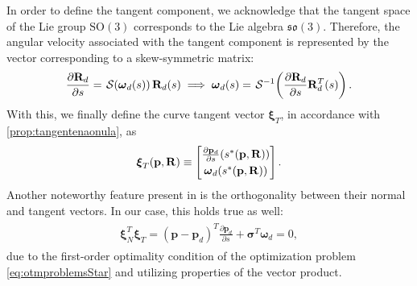 In order to define the tangent component, we acknowledge that the tangent space of the Lie group $\text{SO}(3)$ corresponds to the Lie algebra $\mathfrak{so}(3)$. Therefore, the angular velocity associated with the tangent component is represented by the vector corresponding to a skew-symmetric matrix:
\begin{align}
        \frac{\partial \mathbf{R}_d}{\partial s} = \SL[\boldsymbol{\omega}_d(s)]\mathbf{R}_d(s)
        \implies \boldsymbol{\omega}_d(s) = \invSL[\frac{\partial \mathbf{R}_d}{\partial s}\mathbf{R}_d^T(s)].
\end{align}
With this, we finally define the curve tangent vector $\boldsymbol{\xi}_T$, in accordance with \cref{prop:tangentenaonula}, as
\begin{equation}
    \boldsymbol{\xi}_T(\mathbf{p}, \mathbf{R}) \equiv \begin{bmatrix}
        \frac{\partial \mathbf{p}_d}{\partial s}(s^*(\mathbf{p}, \mathbf{R}))\vspace{1mm}\\
        \boldsymbol{\omega}_d(s^*(\mathbf{p}, \mathbf{R}))
    \end{bmatrix}.
\end{equation}
Another noteworthy feature present in \cite{Rezende2022} is the orthogonality between their normal and tangent vectors. In our case, this holds true as well:
\begin{align}
\begin{split}
\boldsymbol{\xi}_N^T\boldsymbol{\xi}_T = (\mathbf{p} - \mathbf{p}_d)^T\frac{\partial \mathbf{p}_d}{\partial s} + \boldsymbol{\sigma}^T\boldsymbol{\omega}_d = 0,
\end{split} \label{eq:orthogonality}
\end{align}
due to the first-order optimality condition of the optimization problem \eqref{eq:otmproblemsStar} and utilizing properties of the vector product.

